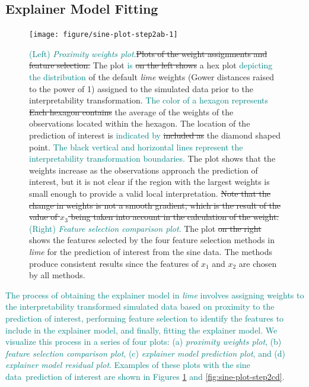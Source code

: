 \documentclass[AMS,STIX2COL]{WileyNJD-v2}\usepackage[]{graphicx}\usepackage[]{color}
\newenvironment{knitrout}{}{} %
\newcommand{\kge}[1]{\textcolor{teal}{#1}}
\newcommand{\data}{sine data}
\begin{document}
{\subsection{Explainer Model Fitting} \label{step2}

\begin{figure}[!htp]
\centering
\begin{knitrout}
\color{fgcolor}
\texttt{[image: figure/sine-plot-step2ab-1]} 

\end{knitrout}
\caption{\kge{(Left) \emph{Proximity weights plot}.}\sout{Plots of the weight assignments and feature selection.} The plot \kge{is} \sout{on the left shows} a hex plot \kge{depicting the distribution} of the default \emph{lime} weights (Gower distances raised to the power of 1) assigned to the simulated data prior to the interpretability transformation. \kge{The color of a hexagon represents} \sout{Each hexagon contains} the average of the weights of the observations located within the hexagon. The location of the prediction of interest is \kge{indicated by} \sout{included as} the diamond shaped point. \kge{The black vertical and horizontal lines represent the interpretability transformation boundaries.} The plot shows that the weights increase as the observations approach the prediction of interest, but it is not clear if the region with the largest weights is small enough to provide a valid local interpretation. \sout{Note that the change in weights is not a smooth gradient, which is the result of the value of $x_3$ being taken into account in the calculation of the weight.} \kge{(Right) \emph{Feature selection comparison plot}.} The plot \sout{on the right} shows the features selected by the four feature selection methods in \emph{lime} for the prediction of interest from the \data. The methods produce consistent results since the features of $x_1$ and $x_2$ are chosen by all methods.}
\label{fig:sine-plot-step2ab}
\end{figure}

\kge{The process of obtaining the explainer model in \emph{lime} involves assigning weights to the interpretability transformed simulated data based on proximity to the prediction of interest, performing feature selection to identify the features to include in the explainer model, and finally, fitting the explainer model. We visualize this process in a series of four plots: (a) \emph{proximity weights plot}, (b) \emph{feature selection comparison plot}, (c) \emph{explainer model prediction plot}, and (d) \emph{explainer model residual plot}. Examples of these plots with the \data \ prediction of interest are shown in Figures \ref{fig:sine-plot-step2ab} and \ref{fig:sine-plot-step2cd}.}

}
\end{document}
